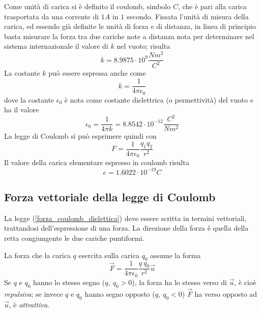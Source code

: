 \documentclass[class=book, crop=false, oneside, 12pt]{standalone}
\begin{document}
Come unità di carica si è definito il coulomb, simbolo \(C\), che è pari alla carica trasportata da una corrente di \(1 A\) in \(1\) secondo. \newline
Fissata l'unità di misura della carica, ed essendo già definite le unità di forza e di distanza, in linea di principio basta misurare la forza tra due cariche note a distanza nota per determinare nel sistema internazionale il valore di \(k\) nel vuoto; risulta
\begin{equation}
    k = 8.9875 \cdot 10^9 \frac{Nm^2}{C^2}
\end{equation}
La costante \(k\) può essere espressa anche come 
\begin{equation*}
    k = \frac{1}{4 \pi \epsilon_0}
\end{equation*}
dove la costante \(\epsilon_0\) è nota come costante dielettrica (o permettività) del vuoto e ha il valore
\begin{equation}
    \epsilon_0 = \frac{1}{4 \pi k} = 8.8542 \cdot 10^{-12} \frac{C^2}{N m^2}
\end{equation}
La legge di Coulomb si può esprimere quindi con
\begin{equation} \label{forza_coulomb_dielettica}
    F = \frac{1}{4 \pi \epsilon_0} \frac{q_1 q_2}{r^2}
\end{equation}
Il valore della carica elementare espresso in coulomb risulta 
\begin{equation}
    e = 1.6022 \cdot 10^{-19} C
\end{equation}

\subsection{Forza vettoriale della legge di Coulomb}

La legge (\ref{forza_coulomb_dielettica}) deve essere scritta in termini vettoriali, trattandosi dell'espressione di una forza.
La direzione della forza è quella della retta congiungente le due cariche puntiformi.

La forza che la carica \(q\) esercita sulla carica \(q_0\) assume la forma
\begin{equation}
    \overrightarrow{F} = \frac{1}{4 \pi \epsilon_0} \frac{q \ q_0}{r^2} \overrightarrow{u}
\end{equation}
Se \(q\) e \(q_0\) hanno lo stesso segno (\(q ,\ q_0 > 0\)), la forza ha lo stesso verso di \(\overrightarrow{u}\), è cioè \emph{repulsiva}; se invece \(q\) e \(q_0\) hanno segno opposto (\(q ,\ q_0 < 0\)) \(\overrightarrow{F}\) ha verso opposto ad \(\overrightarrow{u}\), è \emph{attrattiva}.
\end{document}
